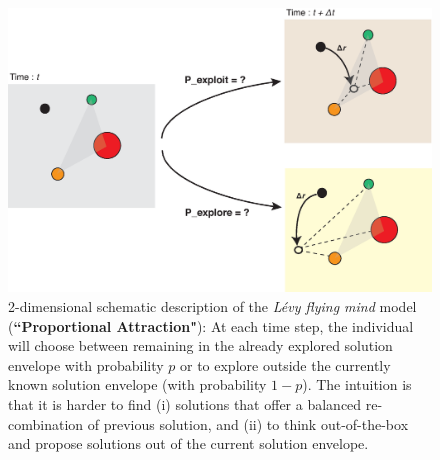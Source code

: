 \begin{figure}[h!]
\begin{center}
\includegraphics[width=15cm]{figures/schematic_displacement.eps}
\caption{2-dimensional schematic description of the {\it L\'evy flying mind} model ({\bf ``Proportional Attraction"}): At each time step, the individual will choose between remaining in the already explored solution envelope with probability $p$ or to explore outside the currently known solution envelope (with probability $1-p$). The intuition is that it is harder to find (i) solutions that offer a balanced re-combination of  previous solution, and (ii) to think out-of-the-box and propose solutions out of the current solution envelope.}
\label{fig:schematic}
\end{center}
\end{figure}

